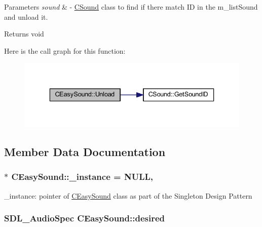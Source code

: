 \begin{DoxyParams}{Parameters}
{\em sound} & -\/ \hyperlink{class_c_sound}{C\+Sound} class to find if there match ID in the m\+\_\+list\+Sound and unload it. \\
\hline
\end{DoxyParams}
\begin{DoxyReturn}{Returns}
void 
\end{DoxyReturn}


Here is the call graph for this function\+:
\nopagebreak
\begin{figure}[H]
\begin{center}
\leavevmode
\includegraphics[width=336pt]{class_c_easy_sound_a7d7e9aa0f0b6cc79ab2cdb179ee9d29f_cgraph}
\end{center}
\end{figure}




\subsection{Member Data Documentation}
\subsubsection[{\texorpdfstring{\+\_\+instance}{_instance}}]{ $\ast$ C\+Easy\+Sound\+::\+\_\+instance = N\+U\+LL\hspace{0.3cm}{\ttfamily [static]}, {\ttfamily [private]}}\hypertarget{class_c_easy_sound_ac1894785d41ee50082c2592cb8fa6ff1}{}\label{class_c_easy_sound_ac1894785d41ee50082c2592cb8fa6ff1}
\+\_\+instance\+: pointer of \hyperlink{class_c_easy_sound}{C\+Easy\+Sound} class as part of the Singleton Design Pattern 
\subsubsection[{\texorpdfstring{desired}{desired}}]{\setlength{\rightskip}{0pt plus 5cm}S\+D\+L\+\_\+\+Audio\+Spec C\+Easy\+Sound\+::desired\hspace{0.3cm}{\ttfamily [private]}}\hypertarget{class_c_easy_sound_a0bba6237523136bdd2f2698b489ab0c5}{}\label{class_c_easy_sound_a0bba6237523136bdd2f2698b489ab0c5}
